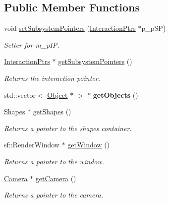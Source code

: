 \subsection*{Public Member Functions}
\begin{DoxyCompactItemize}
\item 
\mbox{\label{class_has_interaction_ptrs_a899e437486cacab5fbaa3cde6af80356}} 
void \hyperlink{class_has_interaction_ptrs_a899e437486cacab5fbaa3cde6af80356}{set\+Subsystem\+Pointers} (\hyperlink{struct_interaction_ptrs}{Interaction\+Ptrs} $\ast$p\+\_\+p\+SP)
\begin{DoxyCompactList}\small\item\em Setter for m\+\_\+p\+IP. \end{DoxyCompactList}\item 
\mbox{\label{class_has_interaction_ptrs_a2bc6b1bc6112768fbcc5c6b83c2857a3}} 
\hyperlink{struct_interaction_ptrs}{Interaction\+Ptrs} $\ast$ \hyperlink{class_has_interaction_ptrs_a2bc6b1bc6112768fbcc5c6b83c2857a3}{get\+Subsystem\+Pointers} ()
\begin{DoxyCompactList}\small\item\em Returns the interaction pointer. \end{DoxyCompactList}\item 
\mbox{\label{class_has_interaction_ptrs_ad7bb97d4ee16b015374108b6514fd02b}} 
std\+::vector$<$ \hyperlink{class_object}{Object} $\ast$ $>$ $\ast$ {\bfseries get\+Objects} ()
\item 
\mbox{\label{class_has_interaction_ptrs_a5efae28f7a0dbbaaea8e728ef5e44fcd}} 
\hyperlink{class_shapes}{Shapes} $\ast$ \hyperlink{class_has_interaction_ptrs_a5efae28f7a0dbbaaea8e728ef5e44fcd}{get\+Shapes} ()
\begin{DoxyCompactList}\small\item\em Returns a pointer to the shapes container. \end{DoxyCompactList}\item 
\mbox{\label{class_has_interaction_ptrs_ab78f0b1500beb0da994b8895831ea366}} 
sf\+::\+Render\+Window $\ast$ \hyperlink{class_has_interaction_ptrs_ab78f0b1500beb0da994b8895831ea366}{get\+Window} ()
\begin{DoxyCompactList}\small\item\em Returns a pointer to the window. \end{DoxyCompactList}\item 
\mbox{\label{class_has_interaction_ptrs_aacd3f410a05c5e6a15cfb18a901eac5c}} 
\hyperlink{class_camera}{Camera} $\ast$ \hyperlink{class_has_interaction_ptrs_aacd3f410a05c5e6a15cfb18a901eac5c}{get\+Camera} ()
\begin{DoxyCompactList}\small\item\em Returns a pointer to the camera. \end{DoxyCompactList}\end{DoxyCompactItemize}

